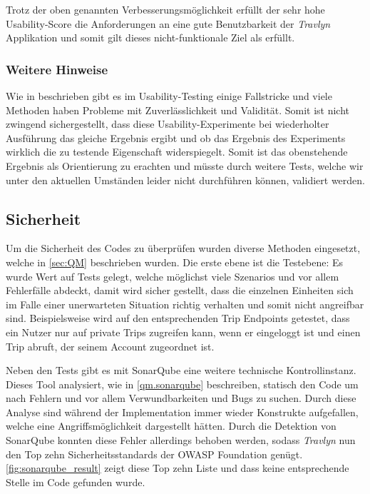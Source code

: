 	\vspace{0.25cm}
	
	Trotz der oben genannten Verbesserungsmöglichkeit erfüllt der sehr hohe Usability-Score die Anforderungen an eine gute Benutzbarkeit der \textit{Travlyn} Applikation und somit gilt dieses nicht-funktionale Ziel als erfüllt. 
	
	\subsubsection{Weitere Hinweise}
	Wie in \cite{Nielsen.20091993} beschrieben gibt es im Usability-Testing einige Fallstricke und viele Methoden haben Probleme mit Zuverlässlichkeit und Validität. Somit ist nicht zwingend sichergestellt, dass diese Usability-Experimente bei wiederholter Ausführung das gleiche Ergebnis ergibt und ob das Ergebnis des Experiments wirklich die zu testende Eigenschaft widerspiegelt. Somit ist das obenstehende Ergebnis als Orientierung zu erachten und müsste durch weitere Tests, welche wir unter den aktuellen Umständen leider nicht durchführen können, validiert werden.
	
	\subsection{Sicherheit}
	Um die Sicherheit des Codes zu überprüfen wurden diverse Methoden eingesetzt, welche in \autoref{sec:QM} beschrieben wurden. Die erste ebene ist die Testebene: Es wurde Wert auf Tests gelegt, welche möglichst viele Szenarios und vor allem Fehlerfälle abdeckt, damit wird sicher gestellt, dass die einzelnen Einheiten sich im Falle einer unerwarteten Situation richtig verhalten und somit nicht angreifbar sind. Beispielsweise wird auf den entsprechenden Trip Endpoints getestet, dass ein Nutzer nur auf private Trips zugreifen kann, wenn er eingeloggt ist und einen Trip abruft, der seinem Account zugeordnet ist.
	
	\vspace{0.25cm}
	
	Neben den Tests gibt es mit SonarQube eine weitere technische Kontrollinstanz. Dieses Tool analysiert, wie in \autoref{qm.sonarqube} beschreiben, statisch den Code um nach Fehlern und vor allem Verwundbarkeiten und Bugs zu suchen. Durch diese Analyse sind während der Implementation immer wieder Konstrukte aufgefallen, welche eine Angriffsmöglichkeit dargestellt hätten. Durch die Detektion von SonarQube konnten diese Fehler allerdings behoben werden, sodass \textit{Travlyn} nun den Top zehn Sicherheitsstandards der OWASP Foundation \cite{OWASPFoundation.20200503T01:28:27.000Z} genügt. \autoref{fig:sonarqube_result} zeigt diese Top zehn Liste und dass keine entsprechende Stelle im Code gefunden wurde.
	
